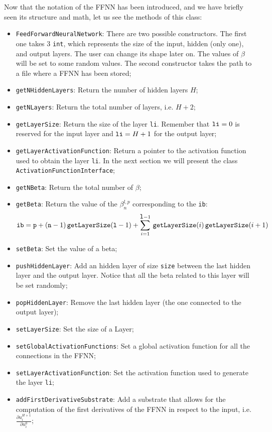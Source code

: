 \documentclass[11pt,a4paper,twoside]{article}
\begin{document}
Now that the notation of the FFNN has been introduced, and we have briefly seen its structure and math, let us see the methods of this class:
\begin{itemize}
\item \verb+FeedForwardNeuralNetwork+: There are two possible constructors. The first one takes $3$ \verb+int+, which represents the size of the input, hidden (only one), and output layers. The user can change its shape later on. The values of $\beta$ will be set to some random values. The second constructor takes the path to a file where a FFNN has been stored;
\item \verb+getNHiddenLayers+: Return the number of hidden layers $H$;
\item \verb+getNLayers+: Return the total number of layers, i.e. $H+2$;
\item \verb+getLayerSize+: Return the size of the layer \verb+li+. Remember that $\verb+li+=0$ is reserved for the input layer and $\verb+li+=H+1$ for the output layer;
\item \verb+getLayerActivationFunction+: Return a pointer to the activation function used to obtain the layer \verb+li+. In the next section we will present the class \verb+ActivationFunctionInterface+;
\item \verb+getNBeta+: Return the total number of $\beta$;
\item \verb+getBeta+: Return the value of the $\beta^{l,p}_n$ corresponding to the \verb+ib+:
  $$
  {\verb+ib+} = {\verb+p+} + ({\verb+n+}-1) \, \verb+getLayerSize+({\verb+l+}-1) + \sum_{i=1}^{{\verb+l+}-1} \, \verb+getLayerSize+(i) \, \verb+getLayerSize+(i+1)
  $$
\item \verb+setBeta+: Set the value of a beta;
\item \verb+pushHiddenLayer+: Add an hidden layer of size \verb+size+ between the last hidden layer and the output layer. Notice that all the beta related to this layer will be set randomly;
\item \verb+popHiddenLayer+: Remove the last hidden layer (the one connected to the output layer);
\item \verb+setLayerSize+: Set the size of a Layer;
\item \verb+setGlobalActivationFunctions+: Set a global activation function for all the connections in the FFNN;
\item \verb+setLayerActivationFunction+: Set the activation function used to generate the layer \verb+li+;
\item \verb+addFirstDerivativeSubstrate+: Add a substrate that allows for the computation of the first derivatives of the FFNN in respect to the input, i.e. $\frac{\partial u^{H+1}_i}{\partial u^0_i}$;

\end{itemize}
\end{document}
